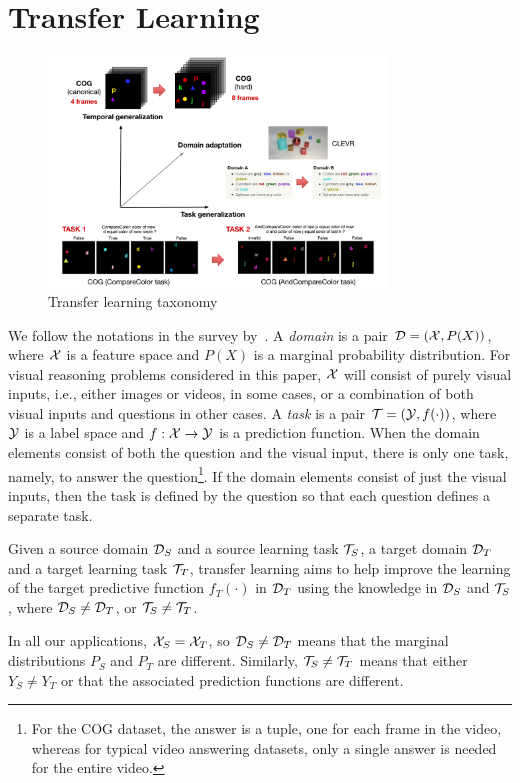 \section{Transfer Learning}

\begin{figure}
	\caption{Transfer learning taxonomy}
	\label{fig:taskonomy}
	\includegraphics[width=0.8\textwidth]{img/architecture/transfer_taxo}
\end{figure}

We follow the notations in the survey by~\cite{pan-yang}.
A \emph{domain} is a pair $\mathcal{D} = (\mathcal{X},P(X))$, where $\mathcal{X}$ is a feature space and $P(X)$ is a marginal probability distribution.
For visual reasoning problems considered in this paper, 
$\mathcal{X}$ will consist of purely visual inputs, i.e., either images or videos, in some cases, or 
a combination of both visual inputs and questions in other cases. 
A \emph{task} is a pair $\mathcal{T}= (\mathcal{Y},f(\cdot))$, where $\mathcal{Y}$ is a label space and $f: \mathcal{X} \to \mathcal{Y}$ is a prediction function. 
When the domain elements consist of both the question and the visual input, there is only one task, namely, to answer the 
question\footnote{%
	For the COG dataset, the answer is a tuple, one for each frame in the video, whereas for typical video answering datasets,
	only a single answer is needed for the entire video.}. %
If the domain elements consist of just the visual inputs, then the task is defined by the question so that each question 
defines a separate task.
\begin{definition} \label{defn:transfer}
	Given a source domain $\mathcal{D}_S$ and a source learning task $\mathcal{T}_S$, a target domain $\mathcal{D}_T$ and a target learning task $\mathcal{T}_T$, transfer learning aims to help improve the 
	learning of the target predictive function $f_T(\cdot)$ in $\mathcal{D}_T$ using the knowledge  in $\mathcal{D}_S$ and $\mathcal{T}_S$, where $\mathcal{D}_S \ne \mathcal{D}_T$, or $\mathcal{T}_S \ne \mathcal{T}_T$.
\end{definition}
In all our applications, $\mathcal{X}_S = \mathcal{X}_T$, so $\mathcal{D}_S \ne \mathcal{D}_T$ means that the marginal distributions $P_S$ and $P_T$ are different.
Similarly, $\mathcal{T}_S \ne \mathcal{T}_T$ means that either $Y_S \ne Y_T$ or that the associated prediction functions are different.

